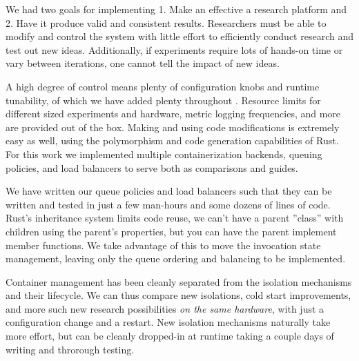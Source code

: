 We had two goals for implementing \sysname{} 1. Make an effective a research platform and 2. Have it produce valid and consistent results.
Researchers must be able to modify and control the system with little effort to efficiently conduct research and test out new ideas.
Additionally, if experiments require lots of hands-on time or vary between iterations, one cannot tell the impact of new ideas.

A high degree of control means plenty of configuration knobs and runtime tunability, of which we have added plenty throughout \sysname{}.
Resource limits for different sized experiments and hardware, metric logging frequencies, and more are provided out of the box.
Making and using code modifications is extremely easy as well, using the polymorphism and code generation capabilities of Rust.
For this work we implemented multiple containerization backends, queuing policies, and load balancers to serve both as comparisons and guides.

We have written our queue policies and load balancers such that they can be written and tested in just a few man-hours and some dozens of lines of code.
Rust's inheritance system limits code reuse, we can't have a parent ''class'' with children using the parent's properties, but you can have the parent implement member functions.
We take advantage of this to move the invocation state management, leaving only the queue ordering and balancing to be implemented.

Container management has been cleanly separated from the isolation mechanisms and their lifecycle.
We can thus compare new isolations, cold start improvements, and more such new research possibilities \emph{on the same hardware}, with just a configuration change and a restart.
New isolation mechanisms naturally take more effort, but can be cleanly dropped-in at runtime taking a couple days of writing and throrough testing.




